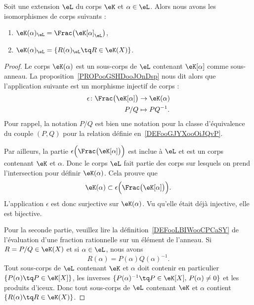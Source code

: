 \begin{proposition}     \label{PROPooYSFNooFGbbCi}
    Soit une extension \( \eL\) du corps \( \eK\) et \( \alpha\in \eL\). Alors nous avons les isomorphismes de corps suivants :
    \begin{enumerate}
        \item
            \( \eK(\alpha)_{\eL}=\Frac\big( \eK[\alpha]_{\eL} \big)\),
        \item       \label{ITEMooATPTooVXKdlK}
            \( \eK(\alpha)_{\eL}=\{ R(\alpha)_{\eL}\tq R\in \eK(X) \}\).
    \end{enumerate}
\end{proposition}

\begin{proof}
    Le corps \( \eK(\alpha)\) est un sous-corps de \( \eL\) contenant \( \eK[\alpha]\) comme sous-anneau. La proposition~\ref{PROPooGSHDooJOnDsp} nous dit alors que l'application suivante est un morphisme injectif de corps :
    \begin{equation}
        \begin{aligned}
            \epsilon\colon \Frac\big( \eK[\alpha] \big)&\to \eK(\alpha) \\
            P/Q&\mapsto PQ^{-1}.
        \end{aligned}
    \end{equation}
    Pour rappel, la notation \( P/Q\) est bien une notation pour la classe d'équivalence du couple \( (P,Q)\) pour la relation définie en~\ref{DEFooGJYXooOiJQvP}.

    Par ailleurs, la partie \( \epsilon\Big( \Frac\big( \eK[\alpha] \big) \Big) \) est inclue à \( \eL\) et est un corps contenant \( \eK\) et \( \alpha\). Donc le corps \( \eL\) fait partie des corps sur lesquels on prend l'intersection pour définir \( \eK(\alpha)\). Cela prouve que
    \begin{equation}
        \eK(\alpha)\subset  \epsilon\Big( \Frac\big( \eK[\alpha] \big) \Big).
    \end{equation}
    L'application \( \epsilon\) est donc surjective sur \( \eK(\alpha)\). Vu qu'elle était déjà injective, elle est bijective.

    Pour la seconde partie, veuillez lire la définition~\ref{DEFooLBIWooCPCaSY} de l'évaluation d'une fraction rationnelle sur un élément de l'anneau. Si \( R=P/Q\in \eK(X)\) et si \( \alpha\in \eL\), nous avons
    \begin{equation}
        R(\alpha)=P(\alpha)Q(\alpha)^{-1}.
    \end{equation}
    Tout sous-corps de \( \eL\) contenant \( \eK\) et \( \alpha\) doit contenir en particulier \( \{ P(\alpha)\tq P\in \eK[X] \} \), les inverses \( \{ P(\alpha)^{-1}\tq P\in \eK[X],\,P(\alpha)\neq 0 \}\) et les produits d'iceux. Donc tout sous-corps de \( \eL\) contenant \( \eK\) et \( \alpha\) contient \( \{ R(\alpha)\tq R\in \eK(X) \}\).


\end{proof}
